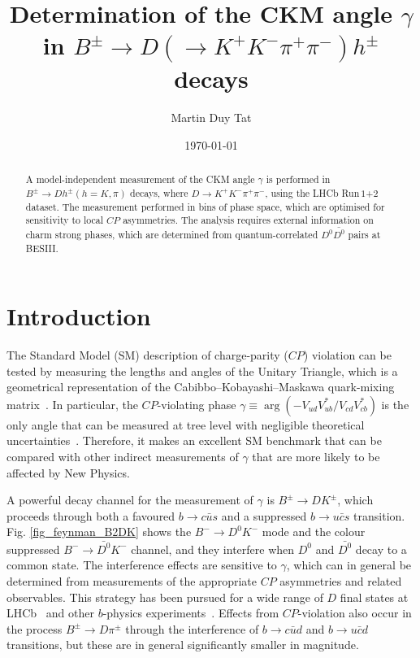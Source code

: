 \documentclass[12pt, a4paper, notitlepage, onecolumn]{article}
\title{Determination of the CKM angle $\gamma$ in $B^\pm\to D(\to K^+K^-\pi^+\pi^-)h^\pm$ decays}
\author{Martin Duy Tat}
\date{\today}
\begin{document}
\maketitle
\begin{abstract}
\noindent A model-independent measurement of the CKM angle $\gamma$ is performed in $B^\pm\to Dh^\pm (h = K, \pi)$ decays, where $D\to K^+K^-\pi^+\pi^-$, using the LHCb Run\,$1$+$2$ dataset. The measurement performed in bins of phase space, which are optimised for sensitivity to local $C\!P$ asymmetries. The analysis requires external information on charm strong phases, which are determined from quantum-correlated $D^0\bar{D^0}$ pairs at BESIII.
\end{abstract}

\section{Introduction}
\noindent The Standard Model (SM) description of charge-parity ($C\!P$) violation can be tested by measuring the lengths and angles of the Unitary Triangle, which is a geometrical representation of the Cabibbo–Kobayashi–Maskawa quark-mixing matrix~\cite{Cabibbo:1963yz,Kobayashi:1973fv}. In particular, the $C\!P$-violating phase  $\gamma\equiv\arg(-V_{ud}V_{ub}^*/V_{cd}V_{cb}^*)$ is the only angle that can be measured at tree level with negligible theoretical uncertainties~\cite{Brod_2014}. Therefore, it makes an excellent SM benchmark that can be compared with other indirect measurements of $\gamma$ that are more likely to be affected by New Physics.

A powerful decay channel for the measurement of $\gamma$ is $B^\pm\to DK^\pm$, which proceeds through both a favoured $b\to c\bar{u}s$ and a suppressed $b\to u\bar{c}s$ transition. Fig. \ref{fig_feynman_B2DK} shows the $B^-\to D^0K^-$ mode and the colour suppressed $B^-\to\bar{D^0}K^-$ channel, and they interfere when $D^0$ and $\bar{D^0}$ decay to a common state. The interference effects are sensitive to $\gamma$, which can in general be determined from measurements of the appropriate $C\!P$ asymmetries and related observables. This strategy has been pursued for a wide range of $D$ final states at LHCb~\cite{LHCb-PAPER-2016-003,LHCb-PAPER-2019-044,LHCb-PAPER-2020-019,LHCb-PAPER-2020-036,LHCb-PAPER-2021-036} and other $b$-physics experiments~\cite{BaBar:2010uep,cite:KSpipipi0_gamma,Belle:2021efh}. Effects from $C\!P$-violation also occur in the process $B^\pm\to D\pi^\pm$ through the interference of $b\to c\bar{u}d$ and $b\to u\bar{c}d$ transitions, but these are in general significantly smaller in magnitude.
\end{document}
